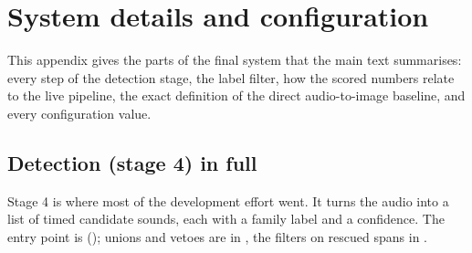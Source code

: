 \section{System details and configuration}\label{app:config}
This appendix gives the parts of the final system that the main text summarises: every step of the detection stage,
the label filter, how the scored numbers relate to the live pipeline, the exact definition of the direct
audio-to-image baseline, and every configuration value.

\subsection{Detection (stage 4) in full}\label{sec:stage4}
Stage 4 is where most of the development effort went. It turns the audio into a list of timed candidate sounds,
each with a family label and a confidence. The entry point is 
(); unions and vetoes are in , the filters on
rescued spans in .

